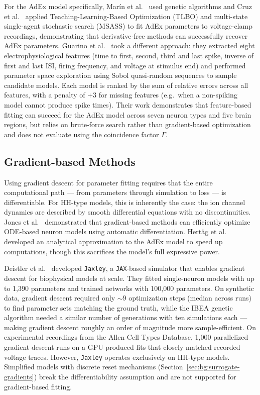 For the \gls{AdEx} model specifically, Mar\'in et al.\ \cite{Marin2020} used genetic algorithms and Cruz et al.\ \cite{Cruz2021} applied Teaching-Learning-Based Optimization (TLBO) and multi-state single-agent stochastic search (MSASS) to fit \gls{AdEx} parameters to voltage-clamp recordings, demonstrating that derivative-free methods can successfully recover \gls{AdEx} parameters.
Guarino et al.\ \cite{Guarino2025} took a different approach: they extracted eight electrophysiological features (time to first, second, third and last spike, inverse of first and last \gls{ISI}, firing frequency, and voltage at stimulus end) and performed parameter space exploration using Sobol quasi-random sequences to sample candidate models.
Each model is ranked by the sum of relative errors across all features, with a penalty of $+3$ for missing features (e.g.\ when a non-spiking model cannot produce spike times).
Their work demonstrates that feature-based fitting can succeed for the \gls{AdEx} model across seven neuron types and five brain regions, but relies on brute-force search rather than gradient-based optimization and does not evaluate using the coincidence factor $\Gamma$.

\subsection{Gradient-based Methods}\label{sec:rw:param-estimation:gbmethod}
Using gradient descent for parameter fitting requires that the entire computational path --- from parameters through simulation to loss --- is differentiable.
For \gls{HH}-type models, this is inherently the case: the ion channel dynamics are described by smooth differential equations with no discontinuities.
Jones et al.\ \cite{Jones2024} demonstrated that gradient-based methods can efficiently optimize ODE-based neuron models using automatic differentiation.
Hertäg et al.\ \cite{Hertag2011} developed an analytical approximation to the \gls{AdEx} model to speed up computations, though this sacrifices the model's full expressive power.

Deistler et al.\ \cite{Deistler2025} developed \texttt{Jaxley}, a \texttt{JAX}-based simulator that enables gradient descent for biophysical models at scale.
They fitted single-neuron models with up to 1,390 parameters and trained networks with 100,000 parameters.
On synthetic data, gradient descent required only $\sim$9 optimization steps (median across runs) to find parameter sets matching the ground truth, while the IBEA genetic algorithm needed a similar number of generations with ten simulations each --- making gradient descent roughly an order of magnitude more sample-efficient.
On experimental recordings from the Allen Cell Types Database, 1,000 parallelized gradient descent runs on a GPU produced fits that closely matched recorded voltage traces.
However, \texttt{Jaxley} operates exclusively on \gls{HH}-type models.
Simplified models with discrete reset mechanisms (Section~\ref{sec:bg:surrogate-gradients}) break the differentiability assumption and are not supported for gradient-based fitting.

